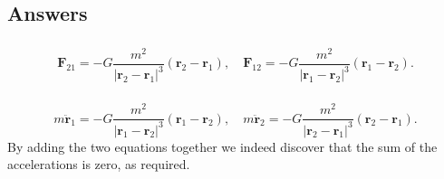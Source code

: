 \documentclass[]{article}
\newcommand{\bb}{\begin{equation}}
\newcommand{\ee}{\end{equation}}
\renewcommand{\l}{\left(}
\renewcommand{\r}{\right)}
\begin{document}
%
%
%
%
%
\begin{Answ}
\subsection{Answers}
\subsubsection{}
\bb
\bm{F}_{21}=-G\frac{m^2}{|\bm{r}_2-\bm{r}_1 |^3}\l \bm{r}_2-\bm{r}_1\r,\quad \bm{F}_{12}=-G\frac{m^2}{|\bm{r}_1-\bm{r}_2 |^3}\l \bm{r}_1-\bm{r}_2\r.
\ee
\subsubsection{}
\bb
m\ddot{\bm{r}}_1=-G\frac{m^2}{|\bm{r}_1-\bm{r}_2 |^3}\l \bm{r}_1-\bm{r}_2\r,\quad m\ddot{\bm{r}}_2=-G\frac{m^2}{|\bm{r}_2-\bm{r}_1 |^3}\l \bm{r}_2-\bm{r}_1\r.
\ee
By adding the two equations together we indeed discover that the sum of the accelerations is zero, as required.
\end{Answ}
\end{document}
